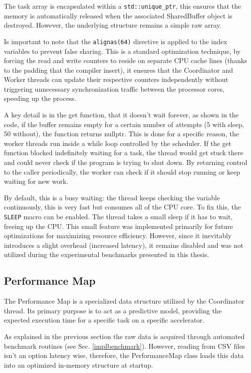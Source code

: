 The task array is encapsulated within a \texttt{std::unique\_ptr}, this ensures that the memory is automatically released when the associated SharedBuffer object is destroyed. However, the underlying structure remains a simple raw array.

Is important to note that the \texttt{alignas(64)} directive is applied to the index variables to prevent false sharing. This is a standard optimization technique, by forcing the read and write counters to reside on separate CPU cache lines (thanks to the padding that the compiler insert), it ensures that the Coordinator and Worker threads can update their respective counters independently without triggering unnecessary synchronization traffic between the processor cores, speeding up the process.

A key detail is in the get function, that it doesn't wait forever, as shown in the code, if the buffer remains empty for a certain number of attempts (5 with sleep, 50 without), the function returns nullptr. This is done for a specific reason, the worker threads run inside a while loop controlled by the scheduler. If the get function blocked indefinitely waiting for a task, the thread would get stuck there and could never check if the program is trying to shut down. By returning control to the caller periodically, the worker can check if it should stop running or keep waiting for new work.

By default, this is a busy waiting: the thread keeps checking the variable continuously, this is very fast but consumes all of the CPU core. To fix this, the \texttt{SLEEP} macro can be enabled. The thread takes a small sleep if it has to wait, freeing up the CPU. This small feature was implemented primarily for future optimizations for maximizing resource efficiency. However, since it inevitably introduces a slight overhead (increased latency), it remains disabled and was not utilized during the experimental benchmarks presented in this thesis.

\clearpage

\subsection{Performance Map}
\label{implperformancemap}
The Performance Map is a specialized data structure utilized by the Coordinator thread. Its primary purpose is to act as a predictive model, providing the expected execution time for a specific task on a specific accelerator.

As explained in the previous section the raw data is acquired through automated benchmark routines (see Sec. \ref{implbenchmark}). However, reading from CSV files isn't an option latency wise, therefore, the PerformanceMap class loads this data into an optimized in-memory structure at startup. 

